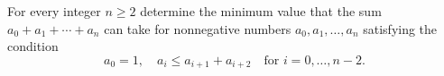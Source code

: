 For every integer $n \geq 2$ determine the minimum value that the sum $a_0 + a_1 + \cdots + a_n$ can take for nonnegative numbers $a_0, a_1, \ldots, a_n$ satisfying the condition
\[ a_0 = 1, \quad a_i \leq a_{i+1} + a_{i+2} \quad \text{for } i = 0, \ldots, n-2. \]
